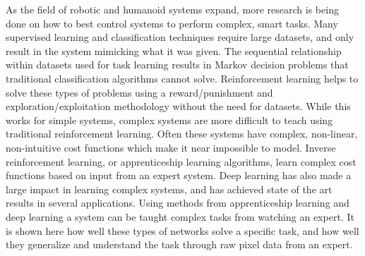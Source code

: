 \documentclass[12pt,american]{report}
\begin{document}
\begin{abstractpage}
As the field of robotic and humanoid systems expand, more research is being done on how to best control systems to perform complex, smart tasks. Many supervised learning and classification techniques require large datasets, and only result in the system mimicking what it was given. The sequential relationship within datasets used for task learning results in Markov decision problems that traditional classification algorithms cannot solve. Reinforcement learning helps to solve these types of problems using a reward/punishment and exploration/exploitation methodology without the need for datasets. While this works for simple systems, complex systems are more difficult to teach using traditional reinforcement learning. Often these systems have complex, non-linear, non-intuitive cost functions which make it near impossible to model.  Inverse reinforcement learning, or apprenticeship learning algorithms, learn complex cost functions based on input from an expert system. Deep learning has also made a large impact in learning complex systems, and has achieved state of the art results in several applications.  Using methods from apprenticeship learning and deep learning a system can be taught complex tasks from watching an expert.  It is shown here how well these types of networks solve a specific task, and how well they generalize and understand the task through raw pixel data from an expert.
\end{abstractpage}




\afterpreface%


\body%
\end{document}
